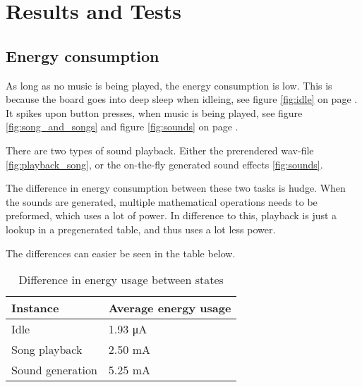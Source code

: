 \section{Results and Tests}

\subsection{Energy consumption}

As long as no music is being played, the energy consumption is low. This is because the board goes into deep sleep when idleing, see figure \ref{fig:idle} on page \pageref{fig:idle}.
It spikes upon button presses, when music is being played, see figure \ref{fig:song_and_songs} and figure \ref{fig:sounds} on page \pageref{fig:song_and_songs}.

There are two types of sound playback.
Either the prerendered wav-file \ref{fig:playback_song}, or the on-the-fly generated sound effects \ref{fig:sounds}.

The difference in energy consumption between these two tasks is hudge.
When the sounds are generated, multiple mathematical operations needs to be preformed, which uses a lot of power.
In difference to this, playback is just a lookup in a pregenerated table, and thus uses a lot less power.

The differences can easier be seen in the table below.

\begin{table}[ht!]
    \begin{center}
    \begin{tabular}{ | l | l | }
        \hline
        Instance            & Average energy usage \\
        \hline
        Idle                & 1.93 \si{\micro\ampere} \\
        \hline
        Song playback       & 2.50 \si{\milli\ampere} \\
        \hline
        Sound generation    & 5.25 \si{\milli\ampere} \\
        \hline
    \end{tabular}
    \caption{Difference in energy usage between states}
    \label{tab:energy_usage}
    \end{center}
\end{table}
